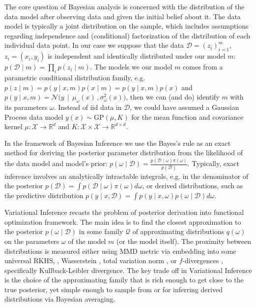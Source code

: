 \documentclass[a4paper,10pt]{article}
\newcommand{\real}{\mathbb{R}}
\begin{document}
The core question of Bayesian analysis is concerned with the distribution of the data model
after observing data and given the initial belief about it. The data model is typically a joint
distribution on the sample, which includes assumptions regarding independence and (conditional)
factorization of the distribution of each individual data point. In our case we suppose that
the data $
  \mathcal{D} = (z_i)_{i=1}^m
$, $z_i = (x_i, y_i)$ is independent and identically distributed under our model $m$: $
  p(\mathcal{D}\mid m)
    = \prod_i p(z_i\mid m)
$. The models we  our model $m$ comes from a parametric conditional distribution family, e.g. $
  p(z \mid m)
    = p(y \mid x, m) p(x \mid m)
    = p(y \mid x, m) p(x)
$ and $
  p(y \mid x, m)
    = \mathcal{N}\bigl(
      y\,\mid\, \mu_\omega(x)\,, \sigma^2_\omega(x)
    \bigr)
$, then we can (and do) identify $m$ with its parameters $\omega$. Instead of iid data in
$\mathcal{D}$, we could have assumed a Gaussian Process data model $
  y(x) \sim \mathrm{GP}(\mu, K)
$ for the mean function and covariance kernel $
  \mu
    \colon \mathcal{X} \to \real^d
$ and $
  K \colon \mathcal{X} \times \mathcal{X}
    \to \real^{d\times d}
$.

In the framework of Bayesian Inference we use the Bayes's rule as an exact method for deriving
the posterior parameter distribution from the likelihood of the data model and model's prior:
$
  p(\omega \mid \mathcal{D})
    = \tfrac{
      p(\mathcal{D} \mid \omega) \pi(\omega)
    }{
      p(\mathcal{D})
    }
$. Typically, exact inference involves an analytically intractable integrals, e.g. in the
denominator of the posterior $
  p(\mathcal{D})
    = \int p(\mathcal{D} \mid \omega) \pi(\omega) d\omega
$, or derived distributions, such as the predictive distribution $
  p(y \mid x, \mathcal{D})
    = \int p(y \mid x, \omega) p(\omega \mid \mathcal{D}) d\omega
$.

Variational Inference recasts the problem of posterior derivation into functional optimization
framework. The main idea is to find the closest approximation to the posterior $
  p(\omega \mid \mathcal{D})
$ in some family $
  \mathcal{Q}
$ of approximating distributions $
  q(\omega)
$ on the parameters $\omega$ of the model $m$ (or the model itself). The proximity between
distributions is measured either using MMD metric via embedding into some universal RKHS,
\cite{citation_needed}, Wasserstein \cite{citation_needed} \cite{citation_needed}, total
variation norm \cite{citation_needed}, or $f$-divergences
\cite{citation_needed}, specifically Kullback-Leibler divergence. The key trade off in Variational
Inference is the choice of the approximating family that is rich enough to get close to the true
posterior, yet simple enough to sample from or for inferring derived distributions via Bayesian
averaging.
\end{document}
